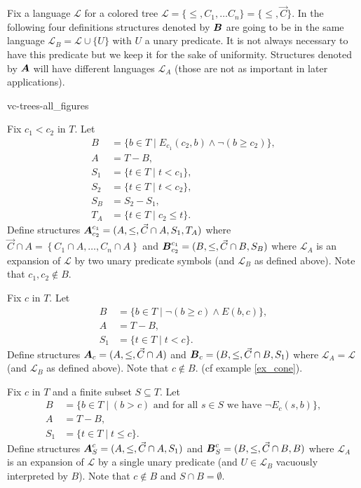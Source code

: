 \documentclass{amsart}
\DeclareMathOperator{\TT}{\boldface T}
\DeclareMathOperator{\A}{\boldface A}
\DeclareMathOperator{\B}{\boldface B}
\renewcommand{\LL}{\mathcal L}
\newcommand{\curly}[1]{\left\{#1\right\}}
\begin{document}
Fix a language $\LL$ for a colored tree $\LL = \{\leq, C_1, \ldots C_n\} = \{\leq, \vec C\}$.
In the following four definitions structures denoted by $\B$ are going to be in the same language $\LL_B = \LL \cup \{U\}$ with $U$ a unary predicate.
It is not always necessary to have this predicate but we keep it for the sake of uniformity.
Structures denoted by $\A$ will have different languages $\LL_A$ (those are not as important in later applications).

 {vc-trees-all_figures}

\begin{Definition}
  Fix $c_1 < c_2$ in $T$. Let
  \begin{align*}
    B &= \{b \in T \mid E_{c_1}(c_2, b) \wedge \neg(b \geq c_2)\}, \\
    A &= T - B, \\
    S_1 &= \{t \in T \mid t < c_1\}, \\
    S_2 &= \{t \in T \mid t < c_2\}, \\
    S_B &= S_2 - S_1, \\
    T_A &= \{t \in T \mid c_2 \leq t\}.
  \end{align*}
  Define structures $\A^{c_1}_{c_2} = (A, \leq, \vec C \cap A, S_1, T_A)$
  where $\vec C \cap A = \curly{C_1 \cap A, \ldots, C_n \cap A}$
  and $\B^{c_1}_{c_2} = (B, \leq, \vec C \cap B, S_B)$ where $\LL_A$ is an expansion of $\LL$ by two unary predicate symbols (and $\LL_B$ as defined above). Note that $c_1, c_2 \notin B$.
\end{Definition}


\begin{Definition}
  Fix $c$ in $T$. Let
  \begin{align*}
    B &= \{b \in T \mid \neg(b \geq c) \wedge E(b,c)\}, \\
    A &= T - B, \\
    S_1 &= \{t \in T \mid t < c\}.
  \end{align*}
  Define structures $\A_{c} = (A, \leq, \vec C \cap A)$ and $\B_{c} = (B, \leq, \vec C\cap B, S_1)$ where $\LL_A = \LL$ (and $\LL_B$ as defined above). Note that $c \notin B$. (cf example \ref{ex_cone}).
\end{Definition}

\begin{Definition}
  Fix $c$ in $T$ and  a finite subset $S \subseteq T$. Let
  \begin{align*}
    B &= \{b \in T \mid (b > c) \text{ and for all $s \in S$ we have } \neg E_c(s, b)\}, \\
    A &= T - B, \\
    S_1 &= \{t \in T \mid t \leq c\}.
  \end{align*}
  Define structures $\A^{c}_{S} = (A, \leq, \vec C\cap A, S_1)$ and $\B^{c}_{S} = (B, \leq, \vec C\cap B, B)$ where $\LL_A$ is an expansion of $\LL$ by a single unary predicate (and $U \in \LL_B$ vacuously interpreted by $B$). Note that $c \notin B$ and $S \cap B = \emptyset$.
\end{Definition}
\end{document}
